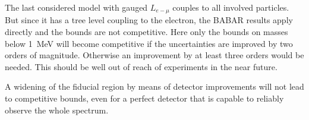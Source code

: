 The last considered model with gauged $L_{e-\mu}$ couples to all involved particles. But since it has a tree level coupling to the electron, the BABAR results apply directly and the bounds are not competitive. Here only the bounds on masses below \SI{1}{\mega \eV} will become competitive if the uncertainties are improved by two orders of magnitude. Otherwise an improvement by at least three orders would be needed. This should be well out of reach of experiments in the near future.

A widening of the fiducial region by means of detector improvements will not lead to competitive bounds, even for a perfect detector that is capable to reliably observe the whole spectrum. 